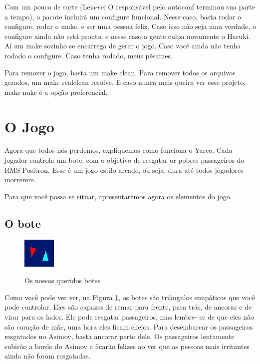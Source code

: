\documentclass[10pt,brazil]{article}
\begin{document}
Com um pouco de sorte (Leia-se: O responsável pelo autoconf terminou sua parte a tempo), o pacote incluirá um configure
funcional. Nesse caso, basta rodar o configure, rodar o make, e ser uma pessoa feliz. Caso isso não seja uma verdade,
o configure ainda não está pronto, e nesse caso a gente culpa novamente o Haruki. Aí um make sozinho se encarrega de
gerar o jogo. Caso você ainda não tenha rodado o configure. Caso tenha rodado, meus pêsames.

Para remover o jogo, basta um make clean. Para remover todos os arquivos gerados, um make realclean resolve. E caso nunca
mais queira ver esse projeto, make nuke é a opção preferencial.

\section{O Jogo}

Agora que todos nós perdemos, expliquemos como funciona o Yarco. Cada jogador controla um bote, com o objetivo de resgatar
or pobres passageiros do RMS Positron. Esse é um jogo estilo arcade, ou seja, dura até todos jogadores morrerem.

Para que você possa se situar, apresentaremos agora os elementos do jogo.

\subsection{O bote}

\begin{figure}
\begin{center}
\includegraphics{boats}
\label{img:boat}
\caption{Os nossos queridos botes}
\end{center}
\end{figure}

Como você pode ver ver, na Figura \ref{img:boat}, os botes são triângulos simpáticos que você pode controlar. Eles são
capazes de remar para frente, para trás, de ancorar e de virar para os lados. Ele pode resgatar passageiros, mas lembre-
se de que eles não são coração de mãe, uma hora eles ficam cheios. Para desembarcar os passageiros resgatados no Asimov,
basta ancorar perto dele. Os passageiros lentamente subirão a bordo do Asimov e ficarão felizes ao ver que as pessoas mais
irritantes ainda não foram resgatadas.
\end{document}
